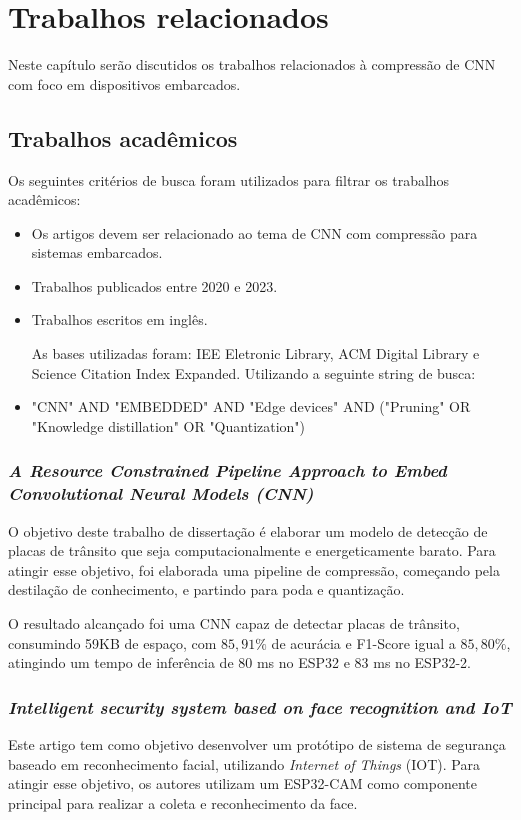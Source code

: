 \chapter{Trabalhos relacionados}\label{cap_trabalhos_relacionados}

Neste capítulo serão discutidos os trabalhos relacionados à compressão de CNN com foco em dispositivos
embarcados.

\section{Trabalhos acadêmicos}

Os seguintes critérios de busca foram utilizados para filtrar os trabalhos acadêmicos:

\begin{itemize}
	\item Os artigos devem ser relacionado ao tema de CNN com compressão para sistemas embarcados.
	\item Trabalhos publicados entre 2020 e 2023.
	\item Trabalhos escritos em inglês.

	As bases utilizadas foram: IEE Eletronic Library, ACM Digital Library e Science Citation Index Expanded.
	Utilizando a seguinte string de busca:
	\item "CNN"  AND "EMBEDDED" AND "Edge devices" AND ("Pruning" OR "Knowledge distillation" OR "Quantization")
\end{itemize}

\subsection{\textit{A Resource Constrained Pipeline Approach to Embed Convolutional Neural Models (CNN)}}
O objetivo deste trabalho de dissertação \cite{rafael} é elaborar um modelo de detecção de placas de trânsito que seja
computacionalmente e energeticamente barato. Para atingir esse objetivo, foi elaborada uma pipeline de compressão,
começando pela destilação de conhecimento, e partindo para poda e quantização.

O resultado alcançado foi uma CNN capaz de detectar placas de trânsito, consumindo 59KB de espaço, com $85,91\%$ de
acurácia e F1-Score igual a $85,80\%$, atingindo um tempo de inferência de 80 ms no ESP32 e 83 ms no ESP32-2.

\subsection{\textit{Intelligent security system based on face recognition and IoT}}
Este artigo \cite{bagchi20222133} tem como objetivo desenvolver um protótipo de sistema de segurança baseado em reconhecimento facial,
utilizando \textit{Internet of Things} (IOT). Para atingir esse objetivo, os autores utilizam um ESP32-CAM como componente
principal para realizar a coleta e reconhecimento da face.

